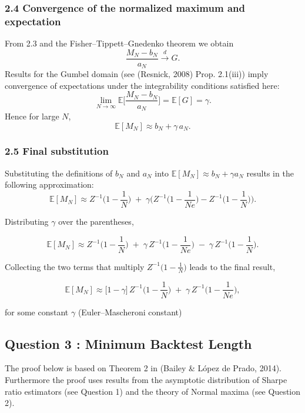 \documentclass[
  12pt,
]{article}
\begin{document}
\subsubsection{2.4 Convergence of the normalized maximum and
expectation}\label{convergence-of-the-normalized-maximum-and-expectation}

From 2.3 and the Fisher--Tippett--Gnedenko theorem we obtain \[
\frac{M_N - b_N}{a_N} \xrightarrow{d} G.
\]Results for the Gumbel domain (see (Resnick, 2008) Prop. 2.1(iii))
imply convergence of expectations under the integrability conditions
satisfied here: \[
\lim_{N\to\infty} \mathbb{E}\!\Big[\frac{M_N - b_N}{a_N}\Big] = \mathbb{E}[G]=\gamma \tag{6}.
\] Hence for large \(N\), \[
\mathbb{E}[M_N] \approx b_N + \gamma\,a_N \tag{7}.
\]

\subsubsection{2.5 Final substitution}\label{final-substitution}

Substituting the definitions of \(b_N\) and \(a_N\) into
\(\mathbb{E}[M_N]\approx b_N+\gamma a_N\) results in the following
approximation: \[
\mathbb{E}[M_N] \approx Z^{-1}\!\Big(1-\frac{1}{N}\Big)
\;+\;\gamma\Big(Z^{-1}\!\Big(1-\frac{1}{Ne}\Big)-Z^{-1}\!\Big(1-\frac{1}{N}\Big)\Big) \tag{8}.
\]

Distributing \(\gamma\) over the parentheses,

\[
\mathbb{E}[M_N] \approx Z^{-1}\!\Big(1-\frac{1}{N}\Big)
\;+\;\gamma\,Z^{-1}\!\Big(1-\frac{1}{Ne}\Big)
\;-\;\gamma\,Z^{-1}\!\Big(1-\frac{1}{N}\Big) \tag{9}.
\]

Collecting the two terms that multiply
\(Z^{-1}\big(1-\tfrac{1}{N}\big)\) leads to the final result,

\[
\mathbb{E}[M_N] \approx \big[1 - \gamma\big]\,Z^{-1}\!\Big(1-\frac{1}{N}\Big)
\;+\;\gamma\,Z^{-1}\!\Big(1-\frac{1}{Ne}\Big) \tag{10},
\]

for some constant \(\gamma\) (Euler--Mascheroni constant)

\newpage

\subsection{Question 3 : Minimum Backtest
Length}\label{question-3-minimum-backtest-length}

The proof below is based on Theorem 2 in (Bailey \& López de Prado,
2014). Furthermore the proof uses results from the asymptotic
distribution of Sharpe ratio estimators (see Question 1) and the theory
of Normal maxima (see Question 2).
\end{document}
